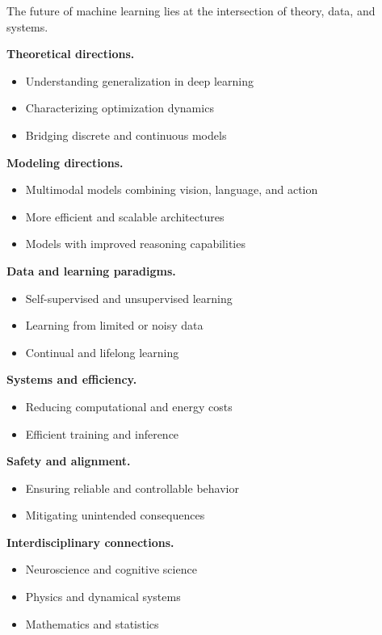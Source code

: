 The future of machine learning lies at the intersection of theory, data, and systems.

\medskip

\noindent
\textbf{Theoretical directions.}
\begin{itemize}
    \item Understanding generalization in deep learning
    \item Characterizing optimization dynamics
    \item Bridging discrete and continuous models
\end{itemize}

\medskip

\noindent
\textbf{Modeling directions.}
\begin{itemize}
    \item Multimodal models combining vision, language, and action
    \item More efficient and scalable architectures
    \item Models with improved reasoning capabilities
\end{itemize}

\medskip

\noindent
\textbf{Data and learning paradigms.}
\begin{itemize}
    \item Self-supervised and unsupervised learning
    \item Learning from limited or noisy data
    \item Continual and lifelong learning
\end{itemize}

\medskip

\noindent
\textbf{Systems and efficiency.}
\begin{itemize}
    \item Reducing computational and energy costs
    \item Efficient training and inference
\end{itemize}

\medskip

\noindent
\textbf{Safety and alignment.}
\begin{itemize}
    \item Ensuring reliable and controllable behavior
    \item Mitigating unintended consequences
\end{itemize}

\medskip

\noindent
\textbf{Interdisciplinary connections.}
\begin{itemize}
    \item Neuroscience and cognitive science
    \item Physics and dynamical systems
    \item Mathematics and statistics
\end{itemize}

